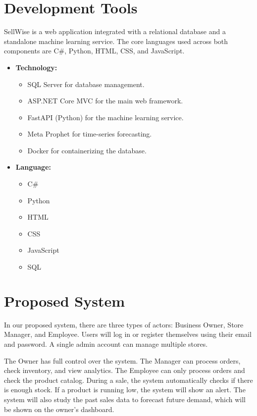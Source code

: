\documentclass[12pt,a4paper]{report}
\begin{document}
\section{Development Tools}
SellWise is a web application integrated with a relational database and a standalone machine learning service. The core languages used across both components are C\#, Python, HTML, CSS, and JavaScript.
\begin{itemize}
    \item \textbf{Technology:}
    \begin{itemize}
        \item SQL Server for database management.
        \item ASP.NET Core MVC for the main web framework.
        \item FastAPI (Python) for the machine learning service.
        \item Meta Prophet for time-series forecasting.
        \item Docker for containerizing the database.
    \end{itemize}
    \item \textbf{Language:}
    \begin{itemize}
        \item C\#
        \item Python
        \item HTML
        \item CSS
        \item JavaScript
        \item SQL
    \end{itemize}
\end{itemize}

\section{Proposed System}
In our proposed system, there are three types of actors: Business Owner, Store Manager, and Employee.
Users will log in or register themselves using their email and password. A single admin account can manage multiple stores. 

The Owner has full control over the system. The Manager can process orders, check inventory, and view analytics. The Employee can only process orders and check the product catalog. 
During a sale, the system automatically checks if there is enough stock. If a product is running low, the system will show an alert. The system will also study the past sales data to forecast future demand, which will be shown on the owner's dashboard.
\end{document}
